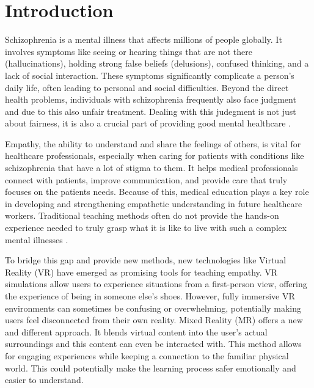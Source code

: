 \chapter{Introduction}
\label{ch:introduction}


Schizophrenia is a mental illness that affects millions of people globally. It involves symptoms like seeing or hearing things that are not there (hallucinations), holding strong false beliefs (delusions), confused thinking, and a lack of social interaction. These symptoms significantly complicate a person's daily life, often leading to personal and social difficulties. Beyond the direct health problems, individuals with schizophrenia frequently also face judgment and due to this also unfair treatment. Dealing with this judegment is not just about fairness, it is also a crucial part of providing good mental healthcare \cite{Shrivastava2011}.

\vspace{1em}

Empathy, the ability to understand and share the feelings of others, is vital for healthcare professionals, especially when caring for patients with conditions like schizophrenia that have a lot of stigma to them. It helps medical professionals connect with patients, improve communication, and provide care that truly focuses on the patients needs. Because of this, medical education plays a key role in developing and strengthening empathetic understanding in future healthcare workers. Traditional teaching methods often do not provide the hands-on experience needed to truly grasp what it is like to live with such a complex mental illnesses \cite{Ruffalo2024}.

\vspace{1em}

To bridge this gap and provide new methods, new technologies like Virtual Reality (VR) have emerged as promising tools for teaching empathy. VR simulations allow users to experience situations from a first-person view, offering the experience of being in someone else's shoes. However, fully immersive VR environments can sometimes be confusing or overwhelming, potentially making users feel disconnected from their own reality. Mixed Reality (MR) offers a new and different approach. It blends virtual content into the user's actual surroundings and this content can even be interacted with. This method allows for engaging experiences while keeping a connection to the familiar physical world. This could potentially make the learning process safer emotionally and easier to understand.

